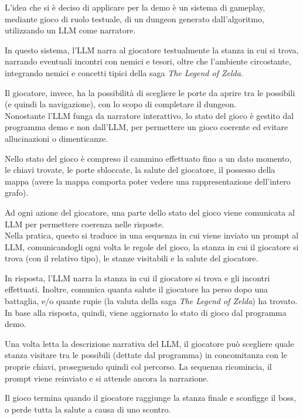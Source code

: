 \documentclass[12pt,titlepage]{article}
\begin{document}
\noindent L'idea che si è deciso di applicare per la demo è un sistema di gameplay, mediante gioco di ruolo testuale, di un dungeon generato dall'algoritmo, utilizzando un LLM come narratore.

In questo sistema, l'LLM narra al giocatore testualmente la stanza in cui si trova, narrando eventuali incontri con nemici e tesori, oltre che l'ambiente circostante, integrando nemici e concetti tipici della saga \textit{The Legend of Zelda}.

Il giocatore, invece, ha la possibilità di scegliere le porte da aprire tra le possibili (e quindi la navigazione), con lo scopo di completare il dungeon.\\

\noindent Nonostante l'LLM funga da narratore interattivo, lo stato del gioco è gestito dal programma demo e non dall'LLM, per permettere un gioco coerente ed evitare allucinazioni o dimenticanze.

Nello stato del gioco è compreso il cammino effettuato fino a un dato momento, le chiavi trovate, le porte sbloccate, la salute del giocatore, il possesso della mappa (avere la mappa comporta poter vedere una rappresentazione dell'intero grafo).

Ad ogni azione del giocatore, una parte dello stato del gioco viene comunicata al LLM per permettere  coerenza nelle risposte.\\

\noindent Nella pratica, questo si traduce in una sequenza in cui viene inviato un prompt al LLM, comunicandogli ogni volta le regole del gioco, la stanza in cui il giocatore si trova (con il relativo tipo), le stanze visitabili e la salute del giocatore.

In risposta, l'LLM narra la stanza in cui il giocatore si trova e gli incontri effettuati. Inoltre, comunica quanta salute il giocatore ha perso dopo una battaglia, e/o quante rupie (la valuta della saga \textit{The Legend of Zelda}) ha trovato. In base alla risposta, quindi, viene aggiornato lo stato di gioco dal programma demo.

Una volta letta la descrizione narrativa del LLM, il giocatore può scegliere quale stanza visitare tra le possibili (dettate dal programma) in concomitanza con le proprie chiavi, proseguendo quindi col percorso. La sequenza ricomincia, il prompt viene reinviato e si attende ancora la narrazione.

Il gioco termina quando il giocatore raggiunge la stanza finale e sconfigge il boss, o perde tutta la salute a causa di uno scontro.\\
\end{document}
